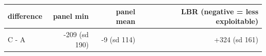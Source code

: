 \begin{tabular}{lrrr}
\toprule
difference & panel min & panel mean & LBR (negative = less exploitable) \\
\midrule
C - A & -209 (sd 190) & -9 (sd 114) & +324 (sd 161) \\
\bottomrule
\end{tabular}
